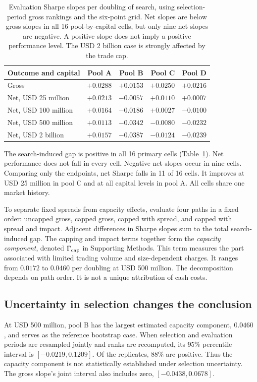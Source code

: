 \documentclass{article}
\begin{document}
\begin{table}[htbp]
\centering
\caption{Evaluation Sharpe slopes per doubling of search, using selection-period gross rankings and the six-point grid. Net slopes are below gross slopes in all 16 pool-by-capital cells, but only nine net slopes are negative. A positive slope does not imply a positive performance level. The USD 2 billion case is strongly affected by the trade cap.}
\label{tab:primary}
\begin{tabular}{lrrrr}
\toprule
Outcome and capital & Pool A & Pool B & Pool C & Pool D\\
\midrule
Gross & $+0.0288$ & $+0.0153$ & $+0.0250$ & $+0.0216$\\
Net, USD 25 million & $+0.0213$ & $-0.0057$ & $+0.0110$ & $+0.0007$\\
Net, USD 100 million & $+0.0164$ & $-0.0186$ & $+0.0027$ & $-0.0100$\\
Net, USD 500 million & $+0.0113$ & $-0.0342$ & $-0.0080$ & $-0.0232$\\
Net, USD 2 billion & $+0.0157$ & $-0.0387$ & $-0.0124$ & $-0.0239$\\
\bottomrule
\end{tabular}

\end{table}

The search-induced gap is positive in all 16 primary cells (Table~\ref{tab:primary}). Net performance does not fall in every cell. Negative net slopes occur in nine cells. Comparing only the endpoints, net Sharpe falls in 11 of 16 cells. It improves at USD 25 million in pool C and at all capital levels in pool A. All cells share one market history.

To separate fixed spreads from capacity effects, evaluate four paths in a fixed order: uncapped gross, capped gross, capped with spread, and capped with spread and impact. Adjacent differences in Sharpe slopes sum to the total search-induced gap. The capping and impact terms together form the \emph{capacity component}, denoted $\Gamma_{\rm cap}$ in Supporting Methods. This term measures the part associated with limited trading volume and size-dependent charges. It ranges from $0.0172$ to $0.0460$ per doubling at USD 500 million. The decomposition depends on path order. It is not a unique attribution of cash costs.

\subsection{Uncertainty in selection changes the conclusion}
At USD 500 million, pool B has the largest estimated capacity component, $0.0460$, and serves as the reference bootstrap case. When selection and evaluation periods are resampled jointly and ranks are recomputed, its 95\% percentile interval is $[-0.0219,0.1209]$. Of the replicates, 88\% are positive. Thus the capacity component is not statistically established under selection uncertainty. The gross slope's joint interval also includes zero, $[-0.0438,0.0678]$.
\end{document}
